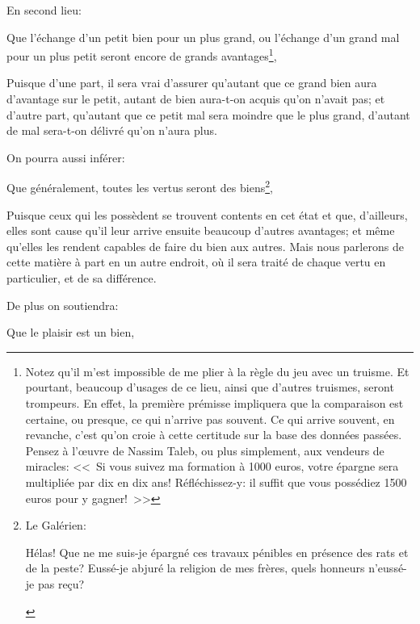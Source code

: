 \bigbreak

En second lieu:

\begin{lieu}
	Que l'échange d'un petit bien pour un plus grand, ou l'échange d'un grand mal pour un plus petit seront encore de
	grands avantages\footnote{Notez qu'il m'est impossible de me plier à la règle du jeu avec un truisme. Et pourtant,
	beaucoup d'usages de ce lieu, ainsi que d'autres truismes, seront trompeurs. En effet, la première prémisse
	impliquera que la comparaison est certaine, ou presque, ce qui n'arrive pas souvent. Ce qui arrive souvent, en
	revanche, c'est qu'on croie à cette certitude sur la base des données passées. Pensez à l’œuvre de Nassim Taleb,
	ou plus simplement, aux vendeurs de miracles: <<~Si vous suivez ma formation à 1000 euros, votre épargne sera
	multipliée par dix en dix ans! Réfléchissez-y: il suffit que vous possédiez 1500 euros pour y gagner!~>>},
\end{lieu}

Puisque d'une part, il sera vrai d'assurer qu'autant que ce grand bien aura d'avantage sur le petit, autant de bien
aura-t-on acquis qu'on n'avait pas; et d'autre part, qu'autant que ce petit mal sera moindre que le plus grand,
d'autant de mal sera-t-on délivré qu'on n'aura plus.

\bigbreak

On pourra aussi inférer:

\begin{lieu}
	Que généralement, toutes les vertus seront des biens\footnote{Le Galérien: \begin{emphpar}\normalfont
	Hélas! Que ne me suis-je épargné ces travaux pénibles en présence des rats et de la peste?
	Eussé-je abjuré la religion de mes frères, quels honneurs n'eussé-je pas reçu?\end{emphpar}},
\end{lieu}

Puisque ceux qui les possèdent se trouvent contents en cet état et que, d'ailleurs, elles sont cause qu'il leur arrive
ensuite beaucoup d'autres avantages; et même qu'elles les rendent capables de faire du bien aux autres. Mais nous
parlerons de cette matière à part en un autre endroit, où il sera traité de chaque vertu en particulier, et de sa
différence.

\bigbreak

De plus on soutiendra:

\begin{lieu}
	Que le plaisir est un bien,
\end{lieu}

